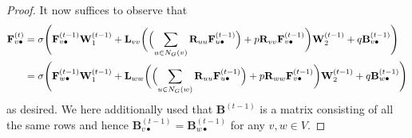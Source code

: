\begin{proof}
  It now suffices to observe that
  \begin{align*}
	  \mathbf{F}^{(t)}_{v\bullet}&=\sigma\Biggl(\mathbf{F}^{(t-1)}_{v\bullet}\mathbf{W}_1^{(t-1)}+\mathbf{L}_{vv}\biggl(\Bigl(\sum_{u\in N_G(v)} \mathbf{R}_{uu}\mathbf{F}^{(t-1)}_{u\bullet}\Bigr)+p\mathbf{R}_{vv}\mathbf{F}^{(t-1)}_{v\bullet}\biggr)\mathbf{W}_2^{(t-1)}+ q\mathbf{B}^{(t-1)}_{v\bullet}\Biggr)\\
	 &=\sigma\Biggl(\mathbf{F}^{(t-1)}_{w\bullet}\mathbf{W}_1^{(t-1)}+\mathbf{L}_{ww}\biggl(\Bigl(\sum_{u\in N_G(w)} \mathbf{R}_{uu}\mathbf{F}^{(t-1)}_{u\bullet}\Bigr)+p\mathbf{R}_{ww}\mathbf{F}^{(t-1)}_{v\bullet}\biggr)\mathbf{W}_2^{(t-1)}+ q\mathbf{B}^{(t-1)}_{w\bullet}\Biggr) \end{align*}
as desired. We here additionally used that $\mathbf{B}^{(t-1)}$ is a matrix consisting of all the same rows and hence $\mathbf{B}^{(t-1)}_{v\bullet}=\mathbf{B}^{(t-1)}_{w\bullet}$ for any $v,w\in V$.
\end{proof}

